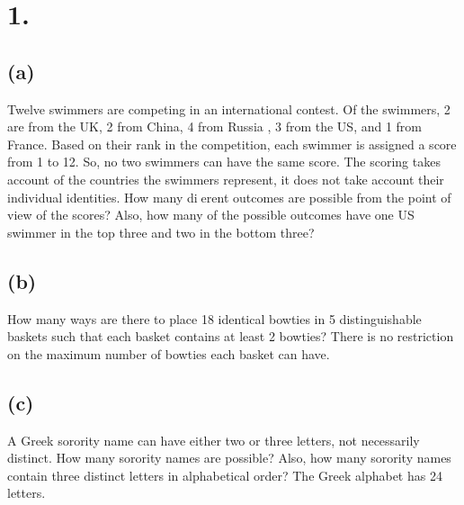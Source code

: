 \documentclass{article}
\begin{document}
\thispagestyle{firstpageheader}

\section*{1.}
{\Large 

\subsection*{(a)}
Twelve swimmers are competing in an international contest. Of the swimmers, 2 are from the
UK, 2 from China, 4 from Russia , 3 from the US, and 1 from France. Based on their rank in the competition,
each swimmer is assigned a score from 1 to 12. So, no two swimmers can have the same score. The scoring
takes account of the countries the swimmers represent, it does not take account their individual identities.
How many dierent outcomes are possible from the point of view of the scores? Also, how many of the
possible outcomes have one US swimmer in the top three and two in the bottom three?

\subsection*{(b)}
How many ways are there to place 18 identical bowties in 5 distinguishable baskets such that
each basket contains at least 2 bowties? There is no restriction on the maximum number of bowties each
basket can have.

\subsection*{(c)}
A Greek sorority name can have either two or three letters, not necessarily distinct. How many
sorority names are possible? Also, how many sorority names contain three distinct letters in alphabetical
order? The Greek alphabet has 24 letters.

}
\end{document}

